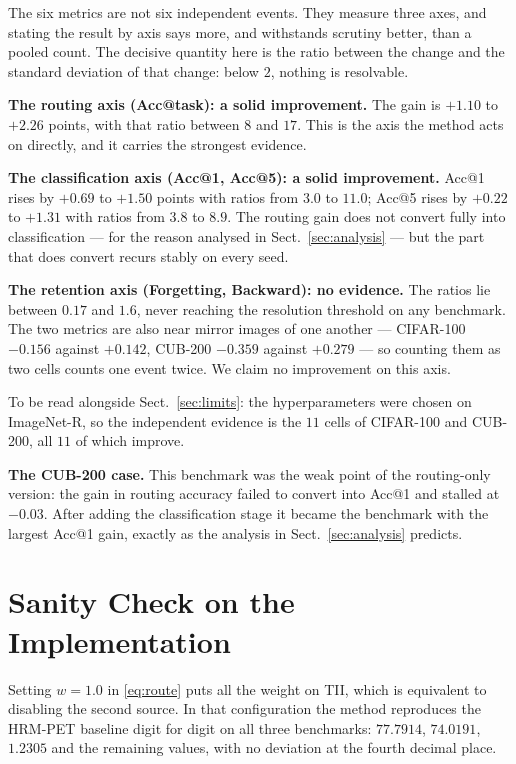 \documentclass[11pt,a4paper]{article}
\begin{document}
The six metrics are not six independent events. They measure three axes, and
stating the result by axis says more, and withstands scrutiny better, than a
pooled count. The decisive quantity here is the ratio between the change and the
standard deviation of that change: below $2$, nothing is resolvable.

\textbf{The routing axis (Acc@task): a solid improvement.} The gain is $+1.10$
to $+2.26$ points, with that ratio between $8$ and $17$. This is the axis the
method acts on directly, and it carries the strongest evidence.

\textbf{The classification axis (Acc@1, Acc@5): a solid improvement.} Acc@1 rises
by $+0.69$ to $+1.50$ points with ratios from $3.0$ to $11.0$; Acc@5 rises by
$+0.22$ to $+1.31$ with ratios from $3.8$ to $8.9$. The routing gain does not
convert fully into classification --- for the reason analysed in
Sect.~\ref{sec:analysis} --- but the part that does convert recurs stably on
every seed.

\textbf{The retention axis (Forgetting, Backward): no evidence.} The ratios lie
between $0.17$ and $1.6$, never reaching the resolution threshold on any
benchmark. The two metrics are also near mirror images of one another ---
CIFAR-100 $-0.156$ against $+0.142$, CUB-200 $-0.359$ against $+0.279$ --- so
counting them as two cells counts one event twice. We claim no improvement on
this axis.

To be read alongside Sect.~\ref{sec:limits}: the hyperparameters were chosen on
ImageNet-R, so the independent evidence is the $11$ cells of CIFAR-100 and
CUB-200, all $11$ of which improve.

\textbf{The CUB-200 case.} This benchmark was the weak point of the
routing-only version: the gain in routing accuracy failed to convert into Acc@1
and stalled at $-0.03$. After adding the classification stage it became the
benchmark with the largest Acc@1 gain, exactly as the analysis in
Sect.~\ref{sec:analysis} predicts.

\section{Sanity Check on the Implementation}
\label{sec:sanity}

Setting $w = 1.0$ in \eqref{eq:route} puts all the weight on TII, which is
equivalent to disabling the second source. In that configuration the method
reproduces the HRM-PET baseline digit for digit on all three benchmarks:
$77.7914$, $74.0191$, $1.2305$ and the remaining values, with no deviation at
the fourth decimal place.
\end{document}
